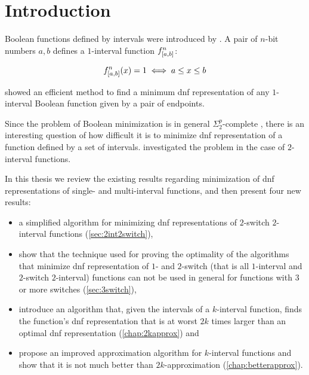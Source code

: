 \chapter*{Introduction}


Boolean functions defined by intervals were introduced
by \citet{Schieber2005154}.
A pair of $n$-bit numbers $a, b$
defines a $1$-interval function
$f^{n}_{[a, b]}$:

$$
f^{n}_{[a, b]} (x) = 1
\iff a \leq x \leq b
$$

\citeauthor{Schieber2005154} showed an efficient method
to find a minimum \acrfull{dnf} representation
of any $1$-interval Boolean function
given by a pair of endpoints.\citep{Schieber2005154}

Since the problem of Boolean minimization is in general
$\Sigma_2^p$-complete \citep{Umans1998},
there is an interesting question of how difficult it is
to minimize \acrshort{dnf} representation of
a function defined by a set of intervals.
\citeauthor{Dubovsky2012} investigated the problem
in the case of $2$-interval functions.\citep{Dubovsky2012}

In this thesis we review the existing results regarding
minimization of \acrshort{dnf} representations of
single- and multi-interval functions,
and then present four new results:

\begin{itemize}
\item a simplified algorithm
for minimizing \acrshort{dnf} representations
of $2$-switch
$2$-interval functions (\cref{sec:2int2switch}),
\item
show that the technique used for proving the optimality
of the algorithms that minimize
\acrshort{dnf} representation
of $1$- and $2$-switch
(that is all $1$-interval
and $2$-switch $2$-interval)
functions
can not be used in general for
functions with $3$ or more switches
(\cref{sec:3switch}),
\item
introduce an algorithm
that,
given the intervals of a $k$-interval function,
finds the function's \acrshort{dnf} representation
that is at worst
$2k$ times larger
than an optimal \acrshort{dnf} representation
(\cref{chap:2kapprox}) and
\item
propose an improved approximation algorithm
for $k$-interval functions
and show that it is not much better than $2k$-approximation
(\cref{chap:betterapprox}).
\end{itemize}
